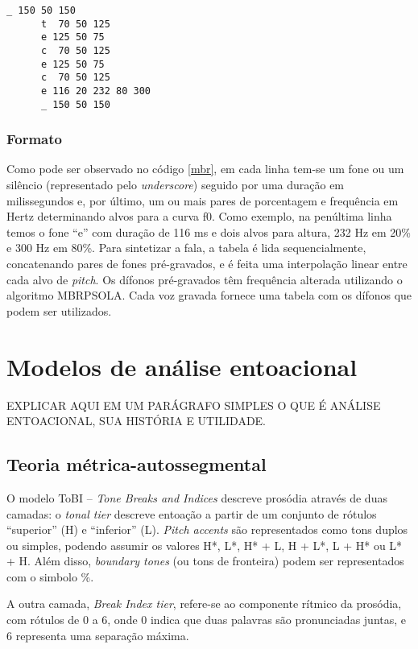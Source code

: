\begin{lstlisting}[caption=Exemplo de arquivo de entrada para MBROLA, label=mbr]
      _ 150 50 150
      t  70 50 125
      e 125 50 75
      c  70 50 125
      e 125 50 75
      c  70 50 125
      e 116 20 232 80 300
      _ 150 50 150
\end{lstlisting}

\subsubsection{Formato}
Como pode ser observado no código \ref{mbr}, em cada linha tem-se um fone ou um
silêncio (representado pelo \emph{underscore}) seguido por uma duração em
milissegundos e, por último, um ou mais pares de porcentagem e frequência em
Hertz determinando alvos para a curva f0. Como exemplo, na penúltima linha temos
o fone ``e'' com duração de 116 ms e dois alvos para altura, 232 Hz em 20\% e
300 Hz em 80\%. Para sintetizar a fala, a tabela é lida sequencialmente,
concatenando pares de fones pré-gravados, e é feita uma interpolação linear
entre cada alvo de \emph{pitch}. Os dífonos pré-gravados têm frequência alterada
utilizando o algoritmo MBRPSOLA. Cada voz gravada fornece uma tabela com os dífonos que podem ser utilizados. 

\section{Modelos de análise entoacional}
\label{entoa}

EXPLICAR AQUI EM UM PARÁGRAFO SIMPLES O QUE É ANÁLISE ENTOACIONAL, SUA HISTÓRIA E UTILIDADE.

\subsection{Teoria métrica-autossegmental}
O modelo ToBI -- \emph{Tone Breaks and Indices} \cite{tobi} descreve prosódia
através de duas camadas: o \emph{tonal tier} descreve entoação a partir de um
conjunto de rótulos ``superior'' (H) e ``inferior'' (L). \emph{Pitch accents}
são representados como tons duplos ou simples, podendo assumir os valores H*, L*, H* + L, H + L*, L + H* ou L* + H. Além disso,
\emph{boundary tones} (ou tons de fronteira) podem ser representados com o simbolo \%.

A outra camada, \emph{Break Index tier}, refere-se ao componente rítmico da
prosódia, com rótulos de 0 a 6, onde 0 indica que duas palavras são
pronunciadas juntas, e 6 representa uma separação máxima.

